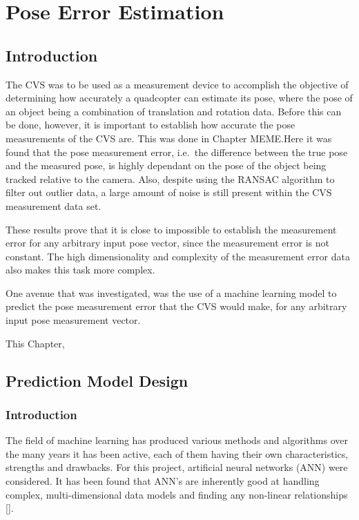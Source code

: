\chapter{Pose Error Estimation}

\section{Introduction}


The CVS was to be used as a measurement device to accomplish the objective of determining how accurately a quadcopter can estimate its pose, where the pose of an object being a combination of translation and rotation data. Before this can be done, however, it is important to establish how accurate the pose measurements of the CVS are. This was done in Chapter MEME.\@ Here it was found that the pose measurement error, i.e.\ the difference between the true pose and the measured pose, is highly dependant on the pose of the object being tracked relative to the camera. Also, despite using the RANSAC algorithm to filter out outlier data, a large amount of noise is still present within the CVS measurement data set. 

These results prove that it is close to impossible to establish the measurement error for any arbitrary input pose vector, since the measurement error is not constant. The high dimensionality and complexity of the measurement error data also makes this task more complex. 

One avenue that was investigated, was the use of a machine learning model to predict the pose measurement error that the CVS would make, for any arbitrary input pose measurement vector. 

This Chapter, 

\section{Prediction Model Design}

\subsection{Introduction}

The field of machine learning has produced various methods and algorithms over the many years it has been active, each of them having their own characteristics, strengths and drawbacks. For this project, artificial neural networks (ANN) were considered. It has been found that ANN's are inherently good at handling complex, multi-dimensional data models and finding any non-linear relationships [\cite{tu1996advantages}].

